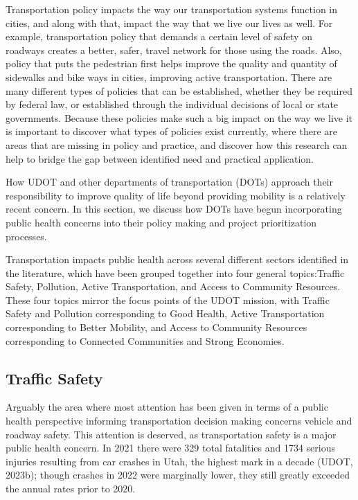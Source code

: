 \documentclass[
  letterpaper,
  DIV=11,
  numbers=noendperiod]{scrreport}
\begin{document}
Transportation policy impacts the way our transportation systems
function in cities, and along with that, impact the way that we live our
lives as well. For example, transportation policy that demands a certain
level of safety on roadways creates a better, safer, travel network for
those using the roads. Also, policy that puts the pedestrian first helps
improve the quality and quantity of sidewalks and bike ways in cities,
improving active transportation. There are many different types of
policies that can be established, whether they be required by federal
law, or established through the individual decisions of local or state
governments. Because these policies make such a big impact on the way we
live it is important to discover what types of policies exist currently,
where there are areas that are missing in policy and practice, and
discover how this research can help to bridge the gap between identified
need and practical application.

How UDOT and other departments of transportation (DOTs) approach their
responsibility to improve quality of life beyond providing mobility is a
relatively recent concern. In this section, we discuss how DOTs have
begun incorporating public health concerns into their policy making and
project prioritization processes.

Transportation impacts public health across several different sectors
identified in the literature, which have been grouped together into four
general topics:Traffic Safety, Pollution, Active Transportation, and
Access to Community Resources. These four topics mirror the focus points
of the UDOT mission, with Traffic Safety and Pollution corresponding to
Good Health, Active Transportation corresponding to Better Mobility, and
Access to Community Resources corresponding to Connected Communities and
Strong Economies.

\hypertarget{traffic-safety}{%
\subsection{Traffic Safety}\label{traffic-safety}}

Arguably the area where most attention has been given in terms of a
public health perspective informing transportation decision making
concerns vehicle and roadway safety. This attention is deserved, as
transportation safety is a major public health concern. In 2021 there
were 329 total fatalities and 1734 serious injuries resulting from car
crashes in Utah, the highest mark in a decade (UDOT, 2023b); though
crashes in 2022 were marginally lower, they still greatly exceeded the
annual rates prior to 2020.
\end{document}
